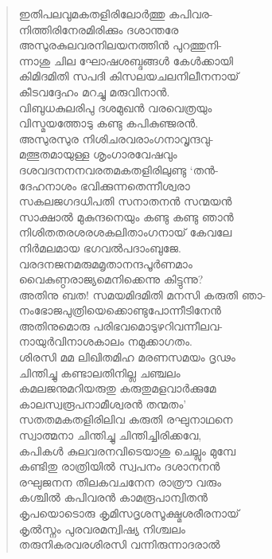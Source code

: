 \begin{verse}
ഇതിപലവുമകതളിരിലോര്‍ത്തു കപിവര-\\
നിത്തിരിനേരമിരിക്കും ദശാന്തരേ\\
അസുരകുലവരനിലയനത്തിന്‍ പുറത്തുനി-\\
ന്നാശു ചില ഘോഷശബ്ദങ്ങള്‍ കേള്‍ക്കായി\\
കിമിദമിതി സപദി കിസലയചലനിലീനനായ്\\
കീടവദ്ദേഹം മറച്ചു മരുവിനാന്‍.\\
വിബുധകുലരിപു ദശമുഖന്‍ വരവെത്രയും\\
വിസ്മയത്തോടു കണ്ടു കപികുഞ്ജരന്‍.\\
അസുരസുര നിശിചരവരാംഗനാവൃന്ദവു-\\
മത്ഭുതമായുള്ള ശൃംഗാരവേഷവും\\
ദശവദനനനവരതമകതളിരിലുണ്ടു ‘തന്‍-\\
ദേഹനാശം ഭവിക്കുന്നതെന്നീശ്വരാ\\
സകലജഗദധിപതി സനാതനന്‍ സന്മയന്‍\\
സാക്ഷാല്‍ മുകുന്ദനെയും കണ്ടു കണ്ടു ഞാന്‍\\
നിശിതതരശരശകലിതാംഗനായ് കേവലേ\\
നിര്‍മലമായ ഭഗവല്‍പദാംബുജേ.\\
വരദനജനമരുമമൃതാനന്ദപൂര്‍ണമാം\\
വൈകുണ്ഠരാജ്യമെനിക്കെന്നു കിട്ടുന്നു?\\
അതിനു ബത! സമയമിദമിതി മനസി കരുതി ഞാ-\\
നംഭോജപുത്രിയെക്കൊണ്ടുപോന്നീടിനേന്‍\\
അതിനുമൊരു പരിഭവമൊടുഴറിവന്നീലവ-\\
നായുര്‍വിനാശകാലം നമുക്കാഗതം.\\
ശിരസി മമ ലിഖിതമിഹ മരണസമയം ദൃഢം\\
ചിന്തിച്ചു കണ്ടാലതിനില്ല ചഞ്ചലം\\
കമലജനുമറിയരുതു കരുതുമളവാര്‍ക്കുമേ\\
കാലസ്വരൂപനാമീശ്വരന്‍ തന്മതം’\\
സതതമകതളിരിലിവ കരുതി രഘുനാഥനെ\\
സ്വാത്മനാ ചിന്തിച്ചു ചിന്തിച്ചിരിക്കവേ,\\
കപികള്‍ കുലവരനവിടെയാശു ചെല്ലും മുമ്പേ\\
കണ്ടിതു രാത്രിയില്‍ സ്വപനം ദശാനനന്‍\\
രഘുജനന തിലകവചനേന രാത്രൗ വരും\\
കശ്ചില്‍ കപിവരന്‍ കാമരൂപാന്വിതന്‍\\
കൃപയൊടൊരു കൃമിസദൃശസൂക്ഷ്മശരീരനായ്\\
കൃല്‍സ്നം പുരവരമന്വിഷ്യ നിശ്ചലം\\
തരുനികരവരശിരസി വന്നിരുന്നാദരാല്‍\\

\end{verse}
